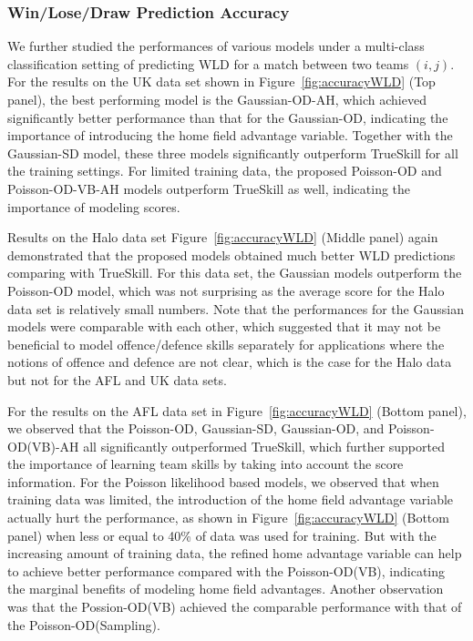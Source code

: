 
\subsubsection{Win/Lose/Draw Prediction Accuracy}
We further studied the performances of various models under a multi-class classification setting of predicting WLD for a match between two teams $(i, j)$. 
For the results on the UK data set shown in Figure~\ref{fig:accuracyWLD} (Top panel), the best performing model is the Gaussian-OD-AH, which achieved significantly better performance than that for the Gaussian-OD, indicating the importance of introducing the home field advantage variable. Together with the Gaussian-SD model, these three models significantly outperform TrueSkill for all the training settings. For limited training data, the proposed Poisson-OD and Poisson-OD-VB-AH models outperform TrueSkill as well, indicating the importance of modeling scores. 

Results on the Halo data set Figure~\ref{fig:accuracyWLD} (Middle panel) again demonstrated that the proposed models obtained much better WLD predictions comparing with TrueSkill. For this data set, the Gaussian models outperform the Poisson-OD model, which was not surprising as the average score for the Halo data set is relatively small numbers. Note that the performances for the Gaussian models were comparable with each other, which suggested that it may not be beneficial to model offence/defence skills separately for applications where the notions of offence and defence are not clear, which is the case for the Halo data but not for the AFL and UK data sets. 

For the results on the AFL data set in Figure~\ref{fig:accuracyWLD} (Bottom panel),  we observed that the Poisson-OD, Gaussian-SD, Gaussian-OD, and Poisson-OD(VB)-AH all significantly outperformed TrueSkill, which further supported the importance of learning team skills by taking into account the score information. For the Poisson likelihood based models, we observed that when training data was limited, the introduction of the home field advantage variable actually hurt the performance, as shown in Figure~\ref{fig:accuracyWLD} (Bottom panel) when less or equal to 40\% of data was used for training. But with the increasing amount of training data, the refined home advantage variable can help to achieve better performance compared with the Poisson-OD(VB), indicating the marginal benefits of modeling home field advantages. Another observation was that the Possion-OD(VB) achieved the comparable performance with that of the Poisson-OD(Sampling). 


